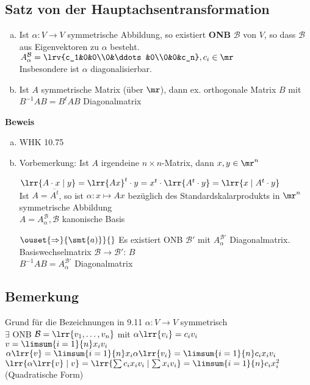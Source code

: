 \subsection{Satz von der Hauptachsentransformation}
	\begin{enumerate}[a)]
		\item Ist $\alpha: V\rightarrow V$ symmetrische Abbildung, so existiert \textbf{ONB} $\mathcal{B}$ von $V$, so dass $\mathcal{B}$ aus Eigenvektoren zu $\alpha$ besteht.\\
			$A_\alpha^{\mathcal{B}}=\lrv{c_1&0&0\\0&\ddots&0\\0&0&c_n}, c_i\in\mr$\\
			Insbesondere ist $\alpha$ diagonalisierbar.
		\item Ist $A$ symmetrische Matrix (über $\mr$), dann ex. orthogonale Matrix $B$ mit $B^{-1} A B =B^tAB$ Diagonalmatrix
	\end{enumerate}
	\textbf{Beweis}
	\begin{enumerate}[a)]
		\item WHK 10.75
		\item Vorbemerkung: Ist $A$ irgendeine $n\times n$-Matrix, dann $x,y\in\mr^n$
			
			$\lrr{A\cdot x\mid y} = \lrr{Ax}^t\cdot y = x^t\cdot\lrr{A^t\cdot y}=\lrr{x\mid A^t\cdot y}$\\
			Ist $A=\overline{A^t}$, so ist $\alpha: x\mapsto Ax$ bezüglich des Standardskalarprodukts in $\mr^n$ symmetrische Abbildung\\
			$A=A_\alpha^{\mathcal{B}}, \mathcal{B}$ kanonische Basis

			$\ouset{\Rightarrow}{\smt{a)}}{}$ Es existiert ONB $\mathcal{B}'$ mit $A_\alpha^{\mathcal{B}'}$ Diagonalmatrix.\\
			Basiswechselmatrix $\mathcal{B}\rightarrow\mathcal{B}'$: $B$\\
			$B^{-1}AB=A_\alpha^{\mathcal{B}'}$ Diagonalmatrix
	\end{enumerate}

\subsection{Bemerkung}
	Grund für die Bezeichnungen in 9.11 $\alpha:V\rightarrow V$ symmetrisch\\
	$\exists$ ONB $\mathcal{B}=\lrr{v_1,\dots,v_n}$ mit $\alpha\lrr{v_i}=c_iv_i$\\
	$v=\limsum{i=1}{n} x_iv_i$\\
	$\alpha\lrr{v}=\limsum{i=1}{n} x_i\alpha\lrr{v_i}=\limsum{i=1}{n} c_ix_iv_i$\\
	$\lrr{\alpha\lrr{v}\mid v}=\lrr{\sum c_ix_iv_i\mid\sum x_iv_i}=\limsum{i=1}{n} c_ix_i^2$ (Quadratische Form)

